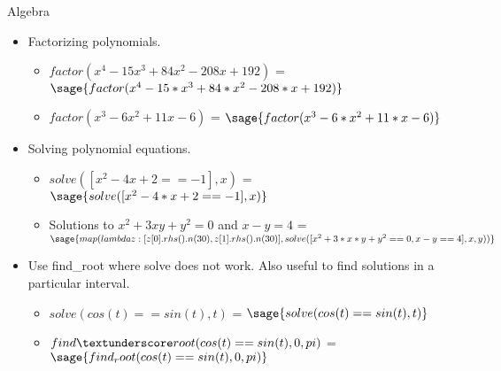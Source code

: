 \documentclass{beamer}
\begin{document}
\begin{frame}{Algebra}
  \begin{itemize}
    \item Factorizing polynomials.
    \begin{itemize}
      \item $factor(x^{4} - 15 x^{3} + 84 x^{2} - 208 x + 192)$ = $\sage{factor(x^4 - 15*x^3 + 84*x^2 - 208*x + 192)}$
      \item $factor(x^{3} - 6 x^{2} +11 x -6)$ = $\sage{factor(x^3 - 6*x^2 +11*x -6)}$
    \end{itemize}
    \item Solving polynomial equations.
    \begin{itemize}
     \item $solve([x^{2} - 4 x + 2 == -1], x)$ = $\sage{solve([x^2 - 4*x + 2 == -1], x)}$
     \item Solutions to $x^{2}+ 3 x y + y^{2} = 0$ and $x - y = 4$ = $\sage{map(lambda z: [z[0].rhs().n(30), z[1].rhs().n(30)], solve([x^2+3*x*y+y^2 == 0, x - y == 4], x, y))}$
    \end{itemize}
    \item Use find\_root where solve does not work. Also useful to find solutions in a particular interval.
    \begin{itemize}
     \item $solve(cos(t) == sin(t), t)$ = $\sage{solve(cos(t) == sin(t), t)}$
     \item $find \textunderscore root(cos(t) == sin(t), 0, pi)$ = $\sage{find_root(cos(t) == sin(t), 0, pi)}$
    \end{itemize}
  \end{itemize}
\end{frame}
\end{document}
